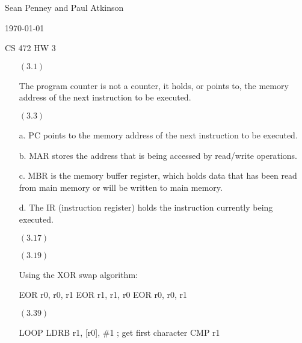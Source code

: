 \documentclass[letterpaper,10pt,titlepage]{article}
\def\name{Sean Penney and Paul Atkinson}
\begin{document}
\hfill \name

\hfill \today

\hfill CS 472 HW 3

\begin{enumerate}
\item[$(3.1)$] 

  The program counter is not a counter, it holds, or points to, the memory address of the next instruction to be executed.

\item[$(3.3)$]

  a.  PC points to the memory address of the next instruction to be executed.
  
  b.  MAR stores the address that is being accessed by read/write operations.
  
  c.  MBR is the memory buffer register, which holds data that has been read from main memory or will be written to main memory.
  
  d.  The IR (instruction register) holds the instruction currently being executed.
  
\item[$(3.17)$]

  

\item[$(3.19)$]   
  
  Using the XOR swap algorithm:
  
  EOR r0, r0, r1
  EOR r1, r1, r0
  EOR r0, r0, r1
  
\item[$(3.39)$]

LOOP	LDRB r1, [r0], \#1	; get first character
		CMP r1
  
\end{enumerate}
\end{document}
